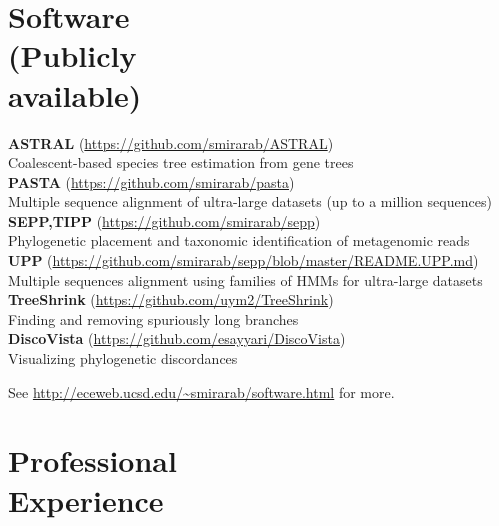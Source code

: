 \documentclass[margin,line,letterpaper]{resume}
\begin{document}
\begin{resume}
\section{\mysidestyle Software\\(Publicly\\available)}
\textbf{ASTRAL} (\url{https://github.com/smirarab/ASTRAL})\\
Coalescent-based species tree estimation from  gene trees\vspace{2mm}\\
\textbf{PASTA} (\url{https://github.com/smirarab/pasta})\\ 
Multiple sequence alignment of ultra-large datasets (up to a million sequences)\vspace{2mm}\\
\textbf{SEPP,TIPP} (\url{https://github.com/smirarab/sepp})\\
Phylogenetic placement and taxonomic identification of metagenomic reads\vspace{2mm}\\
\textbf{UPP} (\url{https://github.com/smirarab/sepp/blob/master/README.UPP.md})\\
Multiple sequences alignment using families of HMMs for ultra-large datasets\vspace{2mm}\\
\textbf{TreeShrink} (\url{https://github.com/uym2/TreeShrink})\\
Finding and removing spuriously long branches\vspace{2mm}\\
\textbf{DiscoVista} (\url{https://github.com/esayyari/DiscoVista})\\
Visualizing phylogenetic discordances\vspace{2mm}

See \url{http://eceweb.ucsd.edu/~smirarab/software.html} for more. 
    \section{\mysidestyle Professional\\Experience}


\end{resume}
\end{document}
